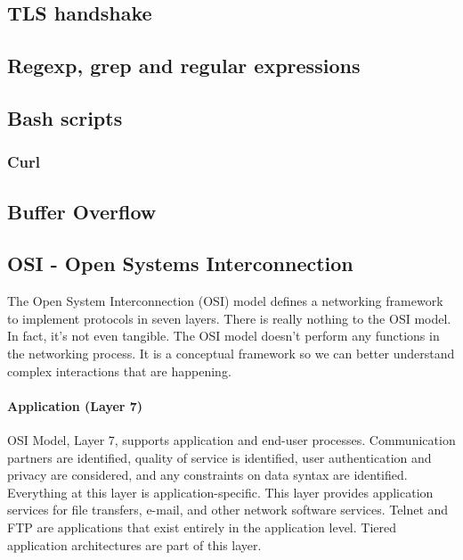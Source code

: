 \documentclass{article}[12pt]
\begin{document}
\subsection{TLS handshake}

\subsection{Regexp, grep and regular expressions}
\subsection{Bash scripts}
\subsubsection{Curl}
\label{subsubsec:curl}

\subsection{Buffer Overflow}



\subsection{OSI - Open Systems Interconnection \cite{osi} }
\label{subsec:osi}
The Open System Interconnection (OSI) model defines a networking framework to implement protocols in seven layers.
There is really nothing to the OSI model.
In fact, it's not even tangible.
The OSI model doesn't perform any functions in the networking process.
It is a conceptual framework so we can better understand complex interactions that are happening.


\paragraph{Application (Layer 7)}

OSI Model, Layer 7, supports application and end-user processes.
Communication partners are identified, quality of service is identified, user authentication and privacy are considered, and any constraints on data syntax are identified.
Everything at this layer is application-specific.
This layer provides application services for file transfers, e-mail, and other network software services.
Telnet and FTP are applications that exist entirely in the application level.
Tiered application architectures are part of this layer.
\end{document}
